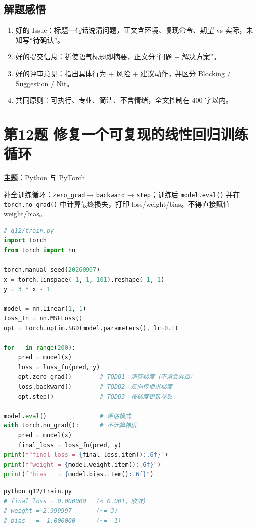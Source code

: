 \documentclass[a4paper,11pt]{article}
\begin{document}
\subsection*{解题感悟}
\begin{enumerate}
  \item 好的 Issue：标题一句话说清问题，正文含环境、复现命令、期望 vs 实际，未知写“待确认”。
  \item 好的提交信息：祈使语气标题即摘要，正文分“问题 + 解决方案”。
  \item 好的评审意见：指出具体行为 + 风险 + 建议动作，并区分 Blocking / Suggestion / Nit。
  \item 共同原则：可执行、专业、简洁、不含情绪，全文控制在 400 字以内。
\end{enumerate}

\section{第12题 修复一个可复现的线性回归训练循环}

\textbf{主题}：Python 与 PyTorch

补全训练循环：\verb|zero_grad| → \verb|backward| → \verb|step|；训练后 \verb|model.eval()| 并在 \verb|torch.no_grad()| 中计算最终损失，打印 loss/weight/bias。不得直接赋值 weight/bias。

\begin{lstlisting}[language=Python]
# q12/train.py
import torch
from torch import nn

torch.manual_seed(20260907)
x = torch.linspace(-1, 1, 101).reshape(-1, 1)
y = 3 * x - 1

model = nn.Linear(1, 1)
loss_fn = nn.MSELoss()
opt = torch.optim.SGD(model.parameters(), lr=0.1)

for _ in range(200):
    pred = model(x)
    loss = loss_fn(pred, y)
    opt.zero_grad()        # TODO1：清空梯度（不清会累加）
    loss.backward()        # TODO2：反向传播求梯度
    opt.step()             # TODO3：按梯度更新参数

model.eval()               # 评估模式
with torch.no_grad():      # 不计算梯度
    pred = model(x)
    final_loss = loss_fn(pred, y)
print(f"final loss = {final_loss.item():.6f}")
print(f"weight = {model.weight.item():.6f}")
print(f"bias   = {model.bias.item():.6f}")
\end{lstlisting}

\begin{lstlisting}[language=bash]
python q12/train.py
# final loss = 0.000000   (< 0.001，收敛)
# weight = 2.999997       (~= 3)
# bias   = -1.000000      (~= -1)
\end{lstlisting}
\end{document}
